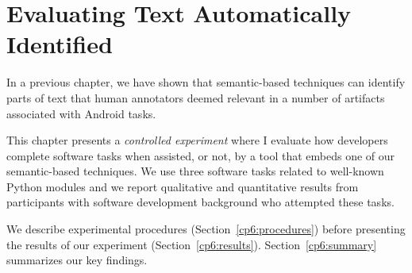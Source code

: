 \setcounter{chapter}{5}
\setcounter{rq}{1}


\chapter{Evaluating Text Automatically Identified}
\label{ch:assisting}



In a previous chapter, we have shown that semantic-based techniques can identify  parts of  text 
that human annotators deemed relevant in a number of artifacts associated with Android tasks. 

This chapter presents a \textit{controlled experiment} 
where I evaluate
how developers complete software tasks when assisted, or not, by a tool that 
embeds one of our semantic-based techniques. 
We use three software tasks related to well-known Python modules and
we report qualitative and quantitative results from  participants with software development background who attempted these tasks. 


We describe experimental procedures (Section~\ref{cp6:procedures}) before
presenting the results of our experiment (Section~\ref{cp6:results}). Section~\ref{cp6:summary} summarizes our key findings.






